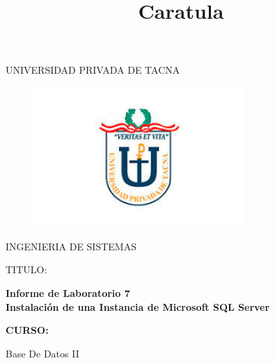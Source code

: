\documentclass[12pt, letterpaper]{article}
\begin{document}
\title{Caratula}

\begin{titlepage}
	\begin{center}
		\large{UNIVERSIDAD PRIVADA DE TACNA}\\

		\vspace*{-0.025in}
			\begin{figure}[htb]
				\begin{center}
					\includegraphics[width=8cm]{./Imagenes/LogoUpt}
				\end{center}
			\end{figure}

		\vspace*{0.15in}
		INGENIERIA DE SISTEMAS  \\

		\vspace*{0.5in}
			\begin{large}
			TITULO:\\
			\end{large}

		\vspace*{0.1in}
			\begin{large}
				\textbf{Informe de Laboratorio 7} \\
				\textbf{Instalación de una Instancia de Microsoft SQL Server} \\
			\end{large}

		\vspace*{0.3in}
			\begin{large}
				\textbf{CURSO:} \\
			\end{large}

		\vspace*{0.1in}
			\begin{large}
				Base De Datos II \\
			\end{large}


\end{center}
\end{titlepage}
\end{document}
